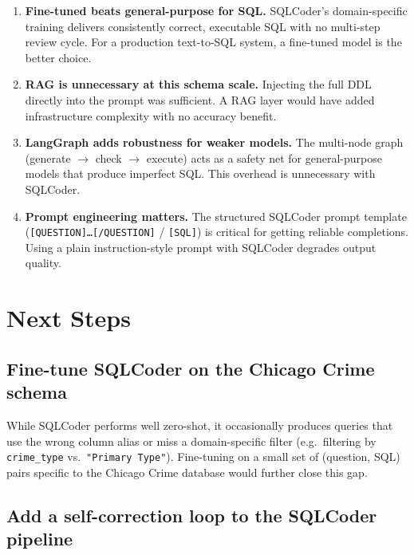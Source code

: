 \documentclass[12pt,a4paper]{article}
\begin{document}
\begin{enumerate}[leftmargin=*, itemsep=4pt]
    \item \textbf{Fine-tuned beats general-purpose for SQL.}  SQLCoder's domain-specific
          training delivers consistently correct, executable SQL with no multi-step
          review cycle.  For a production text-to-SQL system, a fine-tuned model is
          the better choice.

    \item \textbf{RAG is unnecessary at this schema scale.}  Injecting the full DDL
          directly into the prompt was sufficient.  A RAG layer would have added
          infrastructure complexity with no accuracy benefit.

    \item \textbf{LangGraph adds robustness for weaker models.}  The multi-node
          graph (generate $\to$ check $\to$ execute) acts as a safety net for
          general-purpose models that produce imperfect SQL.  This overhead is
          unnecessary with SQLCoder.

    \item \textbf{Prompt engineering matters.}  The structured SQLCoder prompt template
          (\texttt{[QUESTION]…[/QUESTION]} / \texttt{[SQL]}) is critical for getting
          reliable completions.  Using a plain instruction-style prompt with SQLCoder
          degrades output quality.
\end{enumerate}

\section{Next Steps}

\subsection{Fine-tune SQLCoder on the Chicago Crime schema}

While SQLCoder performs well zero-shot, it occasionally produces queries that use
the wrong column alias or miss a domain-specific filter (e.g.\ filtering by
\texttt{crime\_type} vs.\ \texttt{"Primary Type"}).  Fine-tuning on a small set of
(question, SQL) pairs specific to the Chicago Crime database would further close this gap.

\subsection{Add a self-correction loop to the SQLCoder pipeline}
\end{document}
